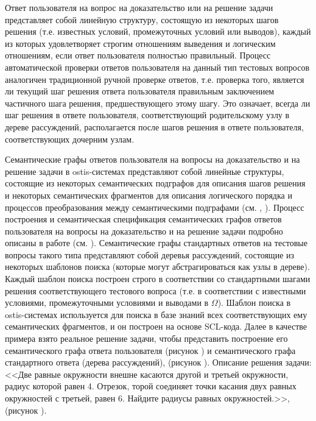 Ответ пользователя на вопрос на доказательство или на решение задачи представляет собой линейную структуру, состоящую из некоторых шагов решения (т.е. известных условий, промежуточных условий или выводов), каждый из которых удовлетворяет строгим отношениям выведения и логическим отношениям, если ответ пользователя полностью правильный. Процесс автоматической проверки ответов пользователя на данный тип тестовых вопросов аналогичен традиционной ручной проверке ответов, т.е. проверка того, является ли текущий шаг решения ответа пользователя правильным заключением частичного шага решения, предшествующего этому шагу. Это означает, всегда ли шаг решения в ответе пользователя, соответствующий родительскому узлу в дереве рассуждений, располагается после шагов решения в ответе пользователя, соответствующих дочерним узлам.

Семантические графы ответов пользователя на вопросы на доказательство и на решение задачи в ostis-системах представляют собой линейные структуры, состоящие из некоторых семантических подграфов для описания шагов решения и некоторых семантических фрагментов для описания логического порядка и процессов преобразования между семантическими подграфами (см. , ). Процесс построения и семантическая спецификация семантических графов ответов пользователя на вопросы на доказательство и на решение задачи подробно описаны в работе (см. ). Семантические графы стандартных ответов на тестовые вопросы такого типа представляют собой деревья рассуждений, состоящие из некоторых шаблонов поиска (которые могут абстрагироваться как узлы в дереве). Каждый шаблон поиска построен строго в соответствии со стандартными шагами решения соответствующего тестового вопроса (т.е. в соответствии с известными условиями, промежуточными условиями и выводами в $\Omega $). Шаблон поиска в ostis-системах используется для поиска в базе знаний всех соответствующих ему семантических фрагментов, и он построен на основе SCL-кода. Далее в качестве примера взято реальное решение задачи, чтобы представить построение его семантического графа ответа пользователя (рисунок \textit{}) и семантического графа стандартного ответа (дерева рассуждений), (рисунок \textit{}). Описание решения задачи: <<Две равные окружности внешне касаются другой и третьей окружности, радиус которой равен 4. Отрезок, торой соединяет точки касания двух равных окружностей с третьей, равен 6. Найдите радиусы равных окружностей.>>, (рисунок \textit{}). 

